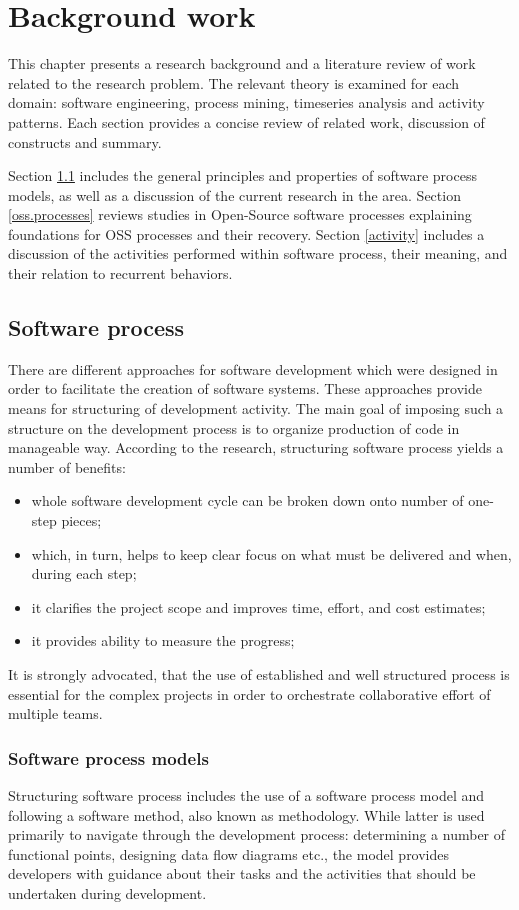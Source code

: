 \chapter{Background work}
This chapter presents a research background and a literature review of work related 
to the research problem.
The relevant theory is examined for each domain: software engineering, process mining,
timeseries analysis and activity patterns. Each section provides a concise review 
of related work, discussion of constructs and summary. 

Section \ref{software.processes} includes the general principles and properties of 
software process models, as well as a discussion of the current research in the area.
Section \ref{oss.processes} reviews studies in Open-Source software processes
explaining foundations for OSS processes and their recovery.
Section \ref{activity} includes a discussion of the activities performed within software
process, their meaning, and their relation to recurrent behaviors.

\section{Software process}\label{software.processes}
There are different approaches for software development which were designed in order to 
facilitate the creation of software systems. These approaches provide means for 
structuring of development activity. The main goal of imposing such a structure on the 
development process is to organize production of code in manageable way. 
According to the research, structuring software process yields a number of benefits:
\begin{itemize}
 \item whole software development cycle can be broken down onto number of one-step pieces;
 \item which, in turn, helps to keep clear focus on what must be delivered and when, during each step;
 \item it clarifies the project scope and improves time, effort, and cost estimates;
 \item it provides ability to measure the progress;
\end{itemize}
It is strongly advocated, that the use of established and well structured process is 
essential for the complex projects in order to orchestrate collaborative effort 
of multiple teams. 

\subsection{Software process models}
Structuring software process includes the use of a software process model and following 
a software method, also known as methodology. While latter is used primarily to navigate 
through the development process: determining a number of functional points, 
designing data flow diagrams etc., the model provides developers with guidance about their 
tasks and the activities that should be undertaken during development. 

